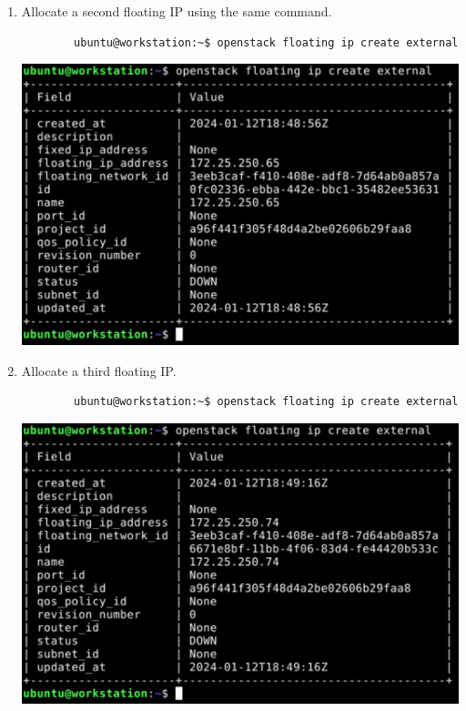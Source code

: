\documentclass[letterpaper, 12pt]{article}
\begin{document}
\begin{enumerate}
    \item Allocate a second floating IP using the same command.
    \begin{lstlisting}
        ubuntu@workstation:~$ openstack floating ip create external
    \end{lstlisting}

    \begin{center}
        \includegraphics[width=\linewidth]{images/part3/step13.png}
    \end{center}

    \item Allocate a third floating IP.
    \begin{lstlisting}
        ubuntu@workstation:~$ openstack floating ip create external
    \end{lstlisting}

    \begin{center}
        \includegraphics[width=\linewidth]{images/part3/step14.png}
    \end{center}


\end{enumerate}
\end{document}
